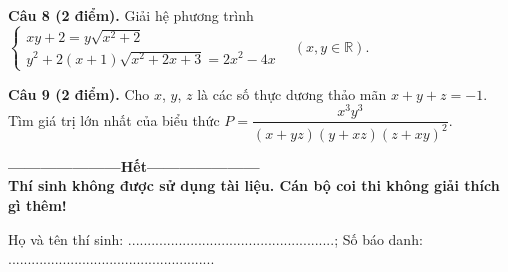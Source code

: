 \documentclass[12pt]{article}
\begin{document}
\noindent\textbf{Câu 8 (2 điểm).}
Giải hệ phương trình $\left\{\begin{array}{l}
xy + 2 = y\sqrt{x^2+2}\\
y^2 + 2(x + 1)\sqrt{x^2 + 2x + 3} = 2x^2 - 4x
\end{array}\right. \ \ \ \ (x, y \in \mathbb{R})$.

\noindent\textbf{Câu 9 (2 điểm).}
Cho $x$, $y$, $z$ là các số thực dương thảo mãn $x + y + z = -1$. Tìm giá trị lớn nhất của biểu thức $P = \dfrac{x^3y^3}{(x + yz)(y + xz)(z + xy)^2}$.

\begin{center}{\bf ---------------------Hết---------------------\\
Thí sinh không được sử dụng tài liệu. Cán bộ coi thi không giải thích gì thêm!\\}\end{center}
Họ và tên thí sinh: .....................................................;	Số báo danh: .....................................................
\end{document}
